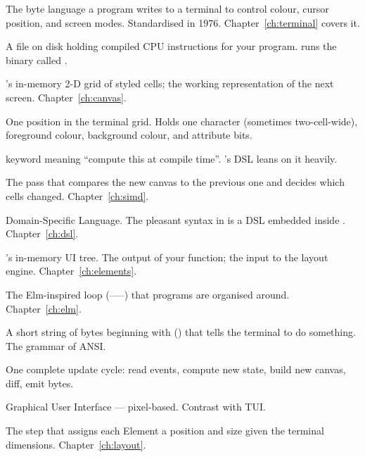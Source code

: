 \begin{description}[leftmargin=*, style=nextline]
  \item[\textbf{ANSI}] The byte language a program writes to a
    terminal to control colour, cursor position, and screen modes.
    Standardised in 1976. Chapter~\ref{ch:terminal} covers it.
  \item[\textbf{Binary, executable}] A file on disk holding compiled
    CPU instructions for your program.  runs the
    binary called .
  \item[\textbf{Canvas}] \maya{}'s in-memory 2-D grid of styled
    cells; the working representation of the next screen.
    Chapter~\ref{ch:canvas}.
  \item[\textbf{Cell}] One position in the terminal grid. Holds one
    character (sometimes two-cell-wide), foreground colour,
    background colour, and attribute bits.
  \item[\textbf{\code{constexpr}}] \cpp{} keyword meaning ``compute
    this at compile time''. \maya{}'s DSL leans on it heavily.
  \item[\textbf{Diff}] The pass that compares the new canvas to the
    previous one and decides which cells changed.
    Chapter~\ref{ch:simd}.
  \item[\textbf{DSL}] Domain-Specific Language. The pleasant
     syntax in \maya{} is a DSL
    embedded inside \cpp{}. Chapter~\ref{ch:dsl}.
  \item[\textbf{Element}] \maya{}'s in-memory UI tree. The output of
    your  function; the input to the layout engine.
    Chapter~\ref{ch:elements}.
  \item[\textbf{Elm runtime}] The Elm-inspired loop
    (------) that
    \maya{} programs are organised around. Chapter~\ref{ch:elm}.
  \item[\textbf{Escape sequence}] A short string of bytes beginning
    with  () that tells the terminal to do
    something. The grammar of ANSI.
  \item[\textbf{Frame}] One complete update cycle: read events,
    compute new state, build new canvas, diff, emit bytes.
  \item[\textbf{GUI}] Graphical User Interface --- pixel-based.
    Contrast with TUI.
  \item[\textbf{Layout}] The step that assigns each Element a
    position and size given the terminal dimensions.
    Chapter~\ref{ch:layout}.

\end{description}
